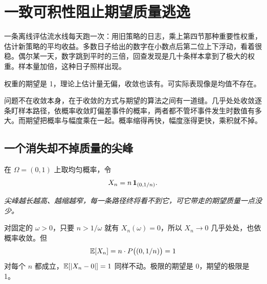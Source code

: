 \section{一致可积性阻止期望质量逃逸}
\label{sec:12-Real-Analysis-Support/05-Measure-Integration-and-Conditional-Expectation/06}

一条离线评估流水线每天跑一次：用旧策略的日志，乘上第四节那种重要性权重，估计新策略的平均收益。多数日子给出的数字在小数点后第二位上下浮动，看着很稳。偶尔某一天，数字跳到平时的三倍，回查发现是几十条样本拿到了极大的权重。样本量加倍，这种日子照样出现。

权重的期望是 1，理论上估计量无偏，收敛也该有。可实际表现像是均值不存在。

问题不在收敛本身，在于收敛的方式与期望的算法之间有一道缝。几乎处处收敛逐条盯样本路径，依概率收敛盯偏差事件的概率，两者都不管坏事件发生时数值有多大。而期望把概率与幅度乘在一起。概率缩得再快，幅度涨得更快，乘积就不掉。

\subsection{一个消失却不掉质量的尖峰}

在 \(\Omega=(0,1)\) 上取均匀概率，令
\[
X_n=n\,\mathbf{1}_{(0,1/n)}.
\]

\begin{center}
\end{center}

\emph{尖峰越长越高、越缩越窄，每一条路径终将看不到它，可它带走的期望质量一点没少。}

对固定的 \(\omega>0\)，只要 \(n>1/\omega\) 就有 \(X_n(\omega)=0\)，所以 \(X_n\to 0\) 几乎处处，也依概率收敛。但
\[
\mathbb{E}[X_n]=n\cdot P\bigl((0,1/n)\bigr)=1
\]
对每个 \(n\) 都成立，\(\mathbb{E}[\left|X_n-0\right|]=1\) 同样不动。极限的期望是 0，期望的极限是 1。

